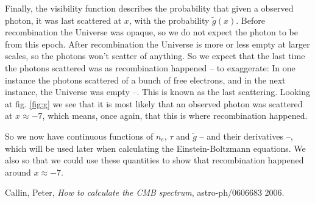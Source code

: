 \documentclass[a4paper,norsk, 10pt]{article}
\begin{document}
Finally, the visibility function describes the probability that given a observed photon, it was last scattered at $x$, with the probability $\tilde{g}(x)$. Before recombination the Universe was opaque, so we do not expect the photon to be from this epoch. After recombination the Universe is more or less empty at larger scales, so the photons won't scatter of anything. So we expect that the last time the photons scattered was as recombination happened -- to exaggerate: In one instance the photons scattered of a bunch of free electrons, and in the next instance, the Universe was empty --. This is known as the last scattering. Looking at fig. \ref{fig:g} we see that it is most likely that an observed photon was scattered at $x\approx -7$, which means, once again, that this is where recombination happened.

So we now have continuous functions of $n_e$, $\tau$ and $\tilde{g}$ -- and their derivatives --, which will be used later when calculating the Einstein-Boltzmann equations. We also so that we could use these quantities to show that recombination happened around $x\approx -7$.


\begin{thebibliography}{9}

  Callin, Peter,
  \textit{How to calculate the CMB spectrum},
  astro-ph/0606683
  2006.

\end{thebibliography}
\end{document}

